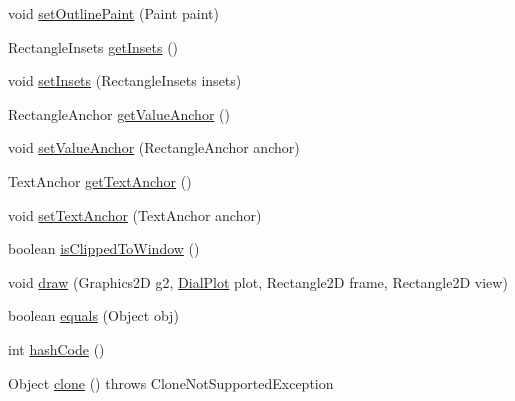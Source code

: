 \begin{DoxyCompactItemize}
\item 
void \mbox{\hyperlink{classorg_1_1jfree_1_1chart_1_1plot_1_1dial_1_1_dial_value_indicator_a7f21f73770eb70660be994c562527efd}{set\+Outline\+Paint}} (Paint paint)
\item 
Rectangle\+Insets \mbox{\hyperlink{classorg_1_1jfree_1_1chart_1_1plot_1_1dial_1_1_dial_value_indicator_af0d989e123325396bb3ca0ea8a824ff6}{get\+Insets}} ()
\item 
void \mbox{\hyperlink{classorg_1_1jfree_1_1chart_1_1plot_1_1dial_1_1_dial_value_indicator_a6dd9a20b2bc7cdded649eddf0e76fcd6}{set\+Insets}} (Rectangle\+Insets insets)
\item 
Rectangle\+Anchor \mbox{\hyperlink{classorg_1_1jfree_1_1chart_1_1plot_1_1dial_1_1_dial_value_indicator_aaacc1d16a645b205f6144deed000fb48}{get\+Value\+Anchor}} ()
\item 
void \mbox{\hyperlink{classorg_1_1jfree_1_1chart_1_1plot_1_1dial_1_1_dial_value_indicator_a373a9fc36d9bdf03d176e02d3a7101b6}{set\+Value\+Anchor}} (Rectangle\+Anchor anchor)
\item 
Text\+Anchor \mbox{\hyperlink{classorg_1_1jfree_1_1chart_1_1plot_1_1dial_1_1_dial_value_indicator_a7be9dd7f474e88ad4b961d8ba6e02d4b}{get\+Text\+Anchor}} ()
\item 
void \mbox{\hyperlink{classorg_1_1jfree_1_1chart_1_1plot_1_1dial_1_1_dial_value_indicator_a11234b9c4cad620ba9edee6123e21611}{set\+Text\+Anchor}} (Text\+Anchor anchor)
\item 
boolean \mbox{\hyperlink{classorg_1_1jfree_1_1chart_1_1plot_1_1dial_1_1_dial_value_indicator_ab1f7edc5ebda4b9b2060e733d27cc674}{is\+Clipped\+To\+Window}} ()
\item 
void \mbox{\hyperlink{classorg_1_1jfree_1_1chart_1_1plot_1_1dial_1_1_dial_value_indicator_a5c89eebcca31f6a2d8bed62e0ef99ab5}{draw}} (Graphics2D g2, \mbox{\hyperlink{classorg_1_1jfree_1_1chart_1_1plot_1_1dial_1_1_dial_plot}{Dial\+Plot}} plot, Rectangle2D frame, Rectangle2D view)
\item 
boolean \mbox{\hyperlink{classorg_1_1jfree_1_1chart_1_1plot_1_1dial_1_1_dial_value_indicator_a5be21a7e058bfe322e2e35c34a859f9b}{equals}} (Object obj)
\item 
int \mbox{\hyperlink{classorg_1_1jfree_1_1chart_1_1plot_1_1dial_1_1_dial_value_indicator_ac8bea0c81662643ffa86cf77eb39d318}{hash\+Code}} ()
\item 
Object \mbox{\hyperlink{classorg_1_1jfree_1_1chart_1_1plot_1_1dial_1_1_dial_value_indicator_ac427cac9267afdeb41245cb4fce845a7}{clone}} ()  throws Clone\+Not\+Supported\+Exception 
\end{DoxyCompactItemize}
